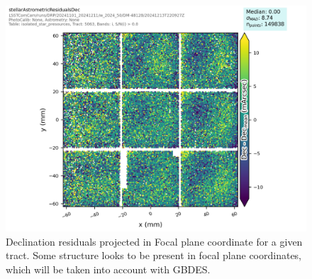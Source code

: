 \begin{figure}
        \centering
        \includegraphics[scale=0.47]{figures/astrometry-f02-focal-plane-plot}
        \caption{\small Declination residuals projected in Focal plane coordinate for a given tract. Some structure looks to be present in focal plane coordinates, which will be taken into account with GBDES. }
        \label{fov_astrometry_plot}
\end{figure}
